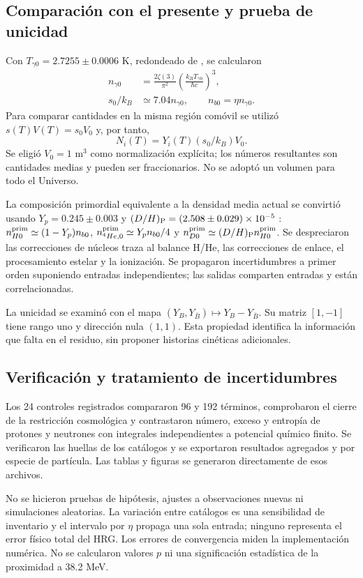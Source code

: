 \subsection{Comparación con el presente y prueba de unicidad}
Con $T_{\gamma0}=2.7255\pm0.0006$ K, redondeado de \citet{Fixsen2009}, se calcularon
\begin{align}
n_{\gamma0}&=\frac{2\zeta(3)}{\pi^2}
\left(\frac{k_BT_{\gamma0}}{\hbar c}\right)^3,\nonumber\\
s_0/k_B&\simeq7.04n_{\gamma0},\qquad
n_{b0}=\eta n_{\gamma0}.\label{eq:present}
\end{align}
Para comparar cantidades en la misma región comóvil se utilizó $s(T)V(T)=s_0V_0$ y, por tanto,
\begin{equation}
N_i(T)=Y_i(T)(s_0/k_B)V_0.\label{eq:comoving}
\end{equation}
Se eligió $V_0=1$ m$^3$ como normalización explícita; los números resultantes son cantidades medias y pueden ser fraccionarios. No se adoptó un volumen para todo el Universo.

La composición primordial equivalente a la densidad media actual se convirtió usando $Y_p=0.245\pm0.003$ y $(D/H)_{\rm P}=(2.508\pm0.029)\times10^{-5}$ \citep{Fields2025}: $n_{H0}^{\rm prim}\simeq(1-Y_p)n_{b0}$, $n_{{}^4He,0}^{\rm prim}\simeq Y_p n_{b0}/4$ y $n_{D0}^{\rm prim}\simeq(D/H)_{\rm P}n_{H0}^{\rm prim}$. Se despreciaron las correcciones de núcleos traza al balance H/He, las correcciones de enlace, el procesamiento estelar y la ionización. Se propagaron incertidumbres a primer orden suponiendo entradas independientes; las salidas comparten entradas y están correlacionadas.

La unicidad se examinó con el mapa $(Y_B,Y_{\bar B})\mapsto Y_B-Y_{\bar B}$. Su matriz $[1,-1]$ tiene rango uno y dirección nula $(1,1)$. Esta propiedad identifica la información que falta en el residuo, sin proponer historias cinéticas adicionales.

\subsection{Verificación y tratamiento de incertidumbres}
Los 24 controles registrados compararon 96 y 192 términos, comprobaron el cierre de la restricción cosmológica y contrastaron número, exceso y entropía de protones y neutrones con integrales independientes a potencial químico finito. Se verificaron las huellas de los catálogos y se exportaron resultados agregados y por especie de partícula. Las tablas y figuras se generaron directamente de esos archivos.

No se hicieron pruebas de hipótesis, ajustes a observaciones nuevas ni simulaciones aleatorias. La variación entre catálogos es una sensibilidad de inventario y el intervalo por $\eta$ propaga una sola entrada; ninguno representa el error físico total del HRG. Los errores de convergencia miden la implementación numérica. No se calcularon valores $p$ ni una significación estadística de la proximidad a 38.2 MeV.
